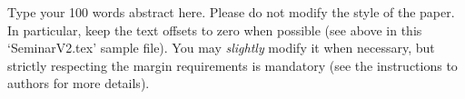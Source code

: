 Type your 100 words abstract here. Please do not modify the style
of the paper. In particular, keep the text offsets to zero when
possible (see above in this `SeminarV2.tex' sample file). You may
\emph{slightly} modify it when necessary, but strictly respecting
the margin requirements is mandatory (see the instructions to
authors for more details).